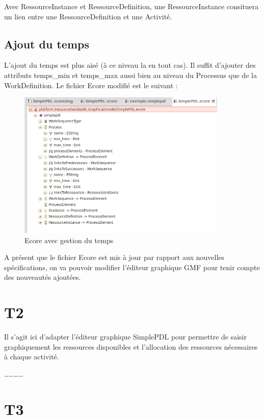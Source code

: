 \documentclass{report}
\begin{document}
Avec RessourceInstance et RessourceDefinition, une RessourceInstance consituera un lien entre une RessourceDefinition et une Activité.

\subsection{Ajout du temps}

L'ajout du temps est plus aisé (à ce niveau la en tout cas). Il suffit d'ajouter des attributs temps\_min et temps\_max aussi bien au niveau du Processus que de la WorkDefinition. Le fichier Ecore modifié est le suivant :\\

\begin{figure}[!h] 
\begin{center}
\includegraphics[width=10cm]{Capture-5.png}
\caption{Ecore avec gestion du temps} 
\label{img1} 
\end{center}
\end{figure} 

A présent que le fichier Ecore est mis à jour par rapport aux nouvelles spécifications, on va pouvoir modifier l'éditeur graphique GMF pour tenir compte des nouveautés ajoutées.

\newpage

\section{T2}

Il s'agit ici d'adapter l’éditeur graphique SimplePDL pour permettre de saisir graphiquement les ressources
disponibles et l’allocation des ressources nécessaires à chaque activité.

\ldots \ldots \ldots \ldots

\section{T3}
\end{document}
